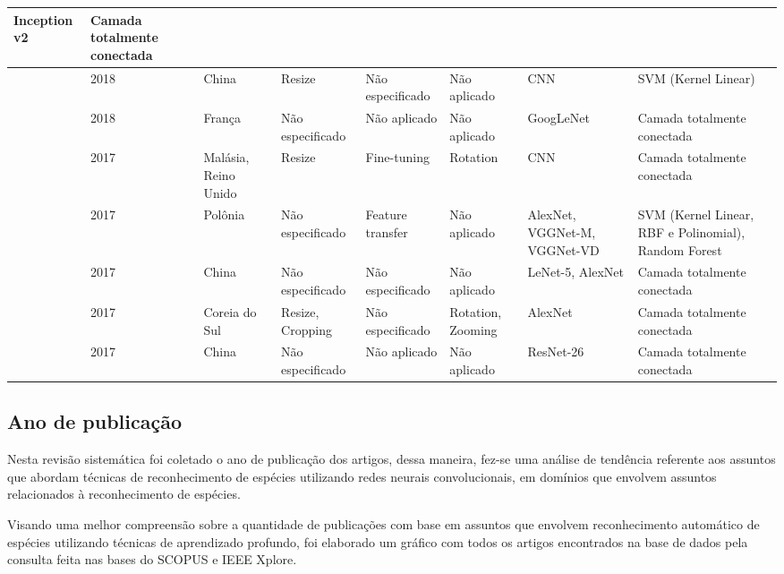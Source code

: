 \documentclass[
	12pt,				%
	oneside,			%
	a4paper,			%
	english,			%
	brazil				%
	]{abntex2ppgsi}
\begin{document}
\begin{landscape}
\begin{OnehalfSpacing}
\begin{footnotesize}
\begin{longtable}{|p{2.3cm}|p{1.3cm}|p{2cm}|p{2.6cm}|p{2.4cm}|p{4.3cm}|p{4.3cm}|p{2.5cm}|}
  Inception v2 &
  Camada totalmente conectada \\ \hline
\cite{zhu2018plant} &
  2018 &
  China &
  Resize &
  Não especificado &
  Não aplicado &
  CNN &
  SVM (Kernel Linear) \\ \hline
\cite{villon2018deep} &
  2018 &
  França &
  Não especificado &
  Não aplicado &
  Não aplicado &
  GoogLeNet &
  Camada totalmente conectada \\ \hline
\cite{lee2017deep} &
  2017 &
  Malásia, Reino Unido &
  Resize &
  Fine-tuning &
  Rotation &
  CNN &
  Camada totalmente conectada \\ \hline
\cite{zielinski2017deep} &
  2017 &
  Polônia &
  Não especificado &
  Feature transfer &
  Não aplicado &
  AlexNet, VGGNet-M, VGGNet-VD &
  SVM (Kernel Linear, RBF e Polinomial), Random Forest \\ \hline
\cite{wang2017crop} &
  2017 &
  China &
  Não especificado &
  Não especificado &
  Não aplicado &
  LeNet-5, AlexNet &
  Camada totalmente conectada \\ \hline
\cite{lim2017performance} &
  2017 &
  Coreia do Sul &
  Resize, Cropping &
  Não especificado &
  Rotation, Zooming &
  AlexNet &
  Camada totalmente conectada \\ \hline
\cite{sun2017deep} &
  2017 &
  China &
  Não especificado &
  Não aplicado &
  Não aplicado &
  ResNet-26 &
  Camada totalmente conectada \\ \hline
  
\end{longtable}
\end{footnotesize}
\end{OnehalfSpacing}
\end{landscape}

\subsection{Ano de publicação}
Nesta revisão sistemática foi coletado o ano de publicação dos artigos, dessa maneira, fez-se  uma análise de tendência referente aos assuntos que abordam técnicas de reconhecimento de espécies utilizando redes neurais convolucionais, em domínios que envolvem assuntos relacionados à reconhecimento de espécies.

Visando uma melhor compreensão sobre a quantidade de publicações com base em assuntos que envolvem reconhecimento automático de espécies utilizando técnicas de aprendizado profundo, foi elaborado um gráfico com todos os artigos encontrados na base de dados pela consulta feita nas bases do SCOPUS e IEEE Xplore. 
\end{document}
